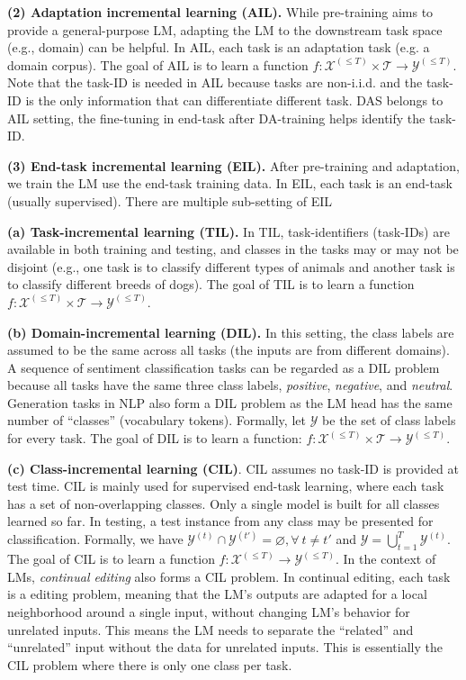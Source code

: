 \documentclass{article} \usepackage{iclr2023_conference,times}
\newcommand{\zixuan}[1]{{\color{red}{\small\bf\sf [zixuan: #1]}}}
\begin{document}
{\textbf{(2) Adaptation incremental learning (AIL).} While pre-training aims to provide a general-purpose LM, adapting the LM to the downstream task space (e.g., domain) can be helpful. In AIL, each task is an adaptation task (e.g. a domain corpus). The goal of AIL is to learn a function $f: \mathcal{X}^{(\leq T)} \times \mathcal{T} \to \mathcal{Y}^{(\leq T)}$. Note that the task-ID is needed in AIL because tasks are non-i.i.d. and the task-ID is the only information that can differentiate different task. DAS belongs to AIL setting, the fine-tuning in end-task after DA-training helps identify the task-ID.

\textbf{(3) End-task incremental learning (EIL).} After pre-training and adaptation, we train the LM use the end-task training data. In EIL, each task is an end-task (usually supervised). There are multiple sub-setting of EIL

\textbf{(a) Task-incremental learning (TIL).} In TIL, task-identifiers (task-IDs) are available in both training and testing, and classes in the tasks may or may not be disjoint (e.g., one task is to classify different types of animals and another task is to classify different breeds of dogs). The goal of TIL is to learn a function $f: \mathcal{X}^{(\leq T)} \times \mathcal{T} \to \mathcal{Y}^{(\leq T)}$.

\textbf{(b) Domain-incremental learning (DIL).} In this setting, the class labels are assumed to be the same across all tasks (the inputs are from different domains). A sequence of sentiment classification tasks can be regarded as a DIL problem because all tasks have the same three class labels, \textit{positive}, \textit{negative}, and \textit{neutral}. Generation tasks in NLP also form a DIL problem as the LM head has the same number of ``classes'' (vocabulary tokens). Formally, let $\mathcal{Y}$ be the set of class labels for every task. {The goal of DIL is to learn a function: $f: \mathcal{X}^{(\leq T)} \times \mathcal{T} \to \mathcal{Y}^{(\leq T)}$.}



\textbf{(c) Class-incremental learning (CIL)}. CIL assumes no task-ID is provided at test time. CIL is mainly used for supervised end-task learning, where each task has a set of non-overlapping classes. Only a single model is built for all classes learned so far. In testing, a test instance from any class may be presented for classification. Formally, we have $\mathcal{Y}^{(t)} \cap \mathcal{Y}^{(t')}= \varnothing, \forall~t \ne t'$ and $\mathcal{Y}=\bigcup_{t=1}^T \mathcal{Y}^{(t)}$. The goal of CIL is to learn a function $f: \mathcal{X}^{(\leq T)} \to \mathcal{Y}^{(\leq T)}$. 
In the context of LMs, \textit{continual editing} also forms a CIL problem. In continual editing, each task is a editing problem, meaning that the LM's outputs are adapted for a local neighborhood around a single input, without changing LM's behavior for unrelated inputs. This means the LM needs to separate the ``related'' and ``unrelated'' input without the data for unrelated inputs. This is essentially the CIL problem where there is only one class per task.



\zixuan{I put all related work to the appendix}
}
\fi
\end{document}
